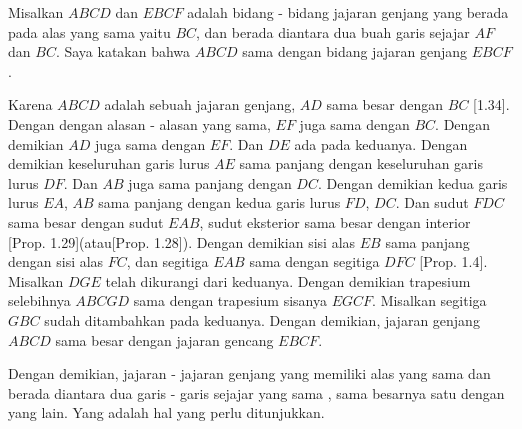 \documentclass[a4paper]{book}
\begin{document}
\begin{center}
\end{center} 
Misalkan $ABCD$ dan $EBCF$ adalah bidang - bidang jajaran genjang yang berada
pada  alas yang sama yaitu $BC$, dan berada diantara dua buah garis sejajar 
$AF$ dan $BC$. Saya katakan bahwa $ABCD$ sama dengan bidang jajaran genjang 
$EBCF$.

Karena $ABCD$ adalah sebuah jajaran genjang, $AD$ sama besar dengan $BC$ 
[1.34].  Dengan dengan alasan - alasan yang sama, $EF$ juga sama dengan 
$BC$.  Dengan demikian $AD$ juga sama dengan $EF$. Dan $DE$ ada pada keduanya.
Dengan demikian keseluruhan garis lurus $AE$ sama panjang dengan keseluruhan
garis lurus $DF$. Dan $AB$ juga sama panjang dengan $DC$. Dengan demikian 
kedua garis lurus $EA$, $AB$ sama panjang dengan kedua garis lurus $FD$, $DC$.
Dan sudut $FDC$ sama besar dengan sudut $EAB$, sudut eksterior sama besar 
dengan interior [Prop. 1.29](atau[Prop. 1.28]). Dengan demikian sisi alas $EB$ 
sama panjang dengan sisi alas $FC$, dan segitiga $EAB$ sama dengan segitiga 
$DFC$ [Prop. 1.4]. Misalkan $DGE$ telah dikurangi dari keduanya. Dengan demikian
trapesium selebihnya $ABCGD$ sama dengan trapesium sisanya $EGCF$. Misalkan
segitiga $GBC$ sudah ditambahkan pada keduanya. Dengan demikian, jajaran 
genjang $ABCD$ sama besar dengan jajaran gencang $EBCF$.

Dengan demikian, jajaran - jajaran genjang yang memiliki alas yang sama dan 
berada diantara dua garis - garis sejajar yang sama , sama besarnya satu 
dengan yang lain.  Yang adalah hal yang perlu ditunjukkan.

\end{document}
